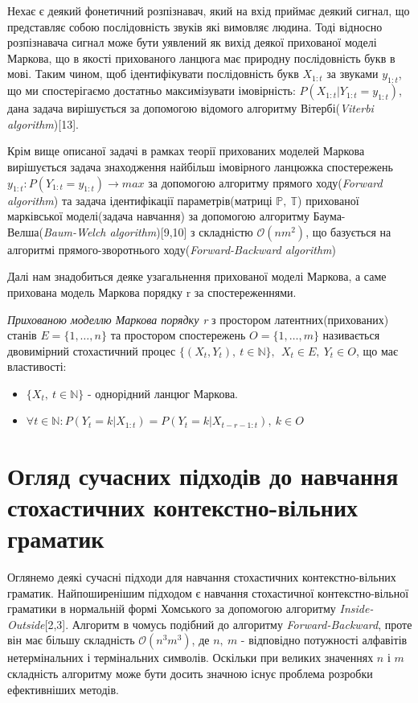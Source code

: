 \begin{example}
  Нехає є деякий фонетичний розпізнавач, який на вхід приймає деякий сигнал, що представляє собою послідовність звуків які вимовляє людина. Тоді відносно розпізнавача сигнал може бути уявлений як вихід деякої прихованої моделі Маркова, що в якості прихованого ланцюга має природну послідовність букв в мові. Таким чином, щоб ідентифікувати послідовність букв $X_{1:t}$ за звуками $y_{1:t}$, що ми спостерігаємо достатньо максимізувати імовірність: $ P(X_{1:t} | Y_{1:t} = y_{1:t}) $, дана задача вирішується за допомогою відомого алгоритму Вітербі(\textit{Viterbi algorithm})[13].
\end{example}
Крім вище описаної задачі в рамках теорії прихованих моделей Маркова вирішується задача знаходження найбільш імовірного ланцюжка спостережень $y_{1:t} \colon P(Y_{1:t} = y_{1:t}) \rightarrow max $ за допомогою алгоритму прямого ходу(\textit{Forward algorithm}) та задача ідентифікації параметрів(матриці $\mathbb{P},\ \mathbb{T}$) прихованої марківської моделі(задача навчання) за допомогою алгоритму Баума-Велша(\textit{Baum-Welch algorithm})[9,10] з складністю $\mathcal{O}(nm^2)$, що базується на алгоритмі прямого-зворотнього ходу(\textit{Forward-Backward algorithm})

Далі нам знадобиться деяке узагальнення прихованої моделі Маркова, а саме прихована модель Маркова порядку r за спостереженнями.
\begin{definition}
  \textit{Прихованою моделлю Маркова порядку r} з простором латентних(прихованих) станів $E = \{ 1,\dots,n \}$ та простором спостережень $O = \{ 1,\dots,m \}$ називається двовимірний стохастичний процес $ \{ (X_t, Y_t),\ t \in \mathbb{N} \},\ \ X_t \in E,\ Y_t \in O $, що має властивості:
  \begin{itemize}
    \item $ \{ X_t,\ t \in \mathbb{N} \} $ - однорідний ланцюг Маркова.
    \item $ \forall t \in \mathbb{N} \colon P(Y_t = k | X_{1:t}) = P(Y_t = k | X_{t-r-1:t}),\ k \in O $
  \end{itemize}
\end{definition}

\section{Огляд сучасних підходів до навчання стохастичних контекстно-вільних граматик}
Оглянемо деякі сучасні підходи для навчання стохастичних контекстно-вільних граматик. Найпоширенішим підходом є навчання стохастичної контекстно-вільної граматики в нормальній формі Хомського за допомогою алгоритму \textit{Inside-Outside}[2,3]. Алгоритм в чомусь подібний до алгоритму \textit{Forward-Backward}, проте він має більшу складність $ \mathcal{O}(n^3m^3) $, де $ n,\ m $ - відповідно потужності алфавітів нетермінальних і термінальних символів. Оскільки при великих значеннях $n$ і $m$ складність алгоритму може бути досить значною існує проблема розробки ефективніших методів.

